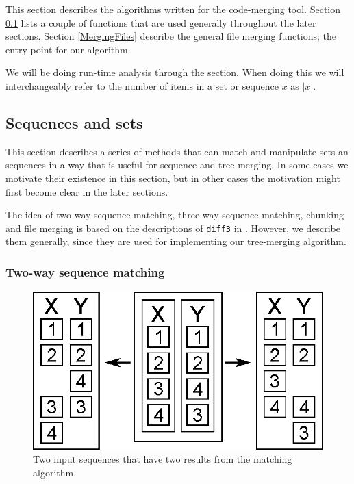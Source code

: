 \documentclass[11pt]{article}
\begin{document}
This section describes the algorithms written for the code-merging tool. Section \ref{UtilitiyMethods} lists a couple of functions that are used generally throughout the later sections. Section \ref{MergingFiles} describe the general file merging functions; the entry point for our algorithm. 

We will be doing run-time analysis through the section. When doing this we will interchangeably refer to the number of items in a set or sequence $x$ as $|x|$.



\subsection{Sequences and sets}
\label{UtilitiyMethods}
This section describes a series of methods that can match and manipulate sets an sequences in a way that is useful for sequence and tree merging. In some cases we motivate their existence in this section, but in other cases the motivation might first become clear in the later sections.

The idea of two-way sequence matching, three-way sequence matching, chunking and file merging is based on the descriptions of \texttt{diff3} in \citet{Khanna}. However, we describe them generally, since they are used for implementing our tree-merging algorithm.

\subsubsection{Two-way sequence matching}
\begin{figure}
   \centerline{\includegraphics[scale=0.4]{drawings/eps/mincostsequencematchingambigious.eps}}
   \caption{Two input sequences that have two results from the matching algorithm.}
   \label{TwoWayMatchingAmbigiouty}
\end{figure}
\end{document}

